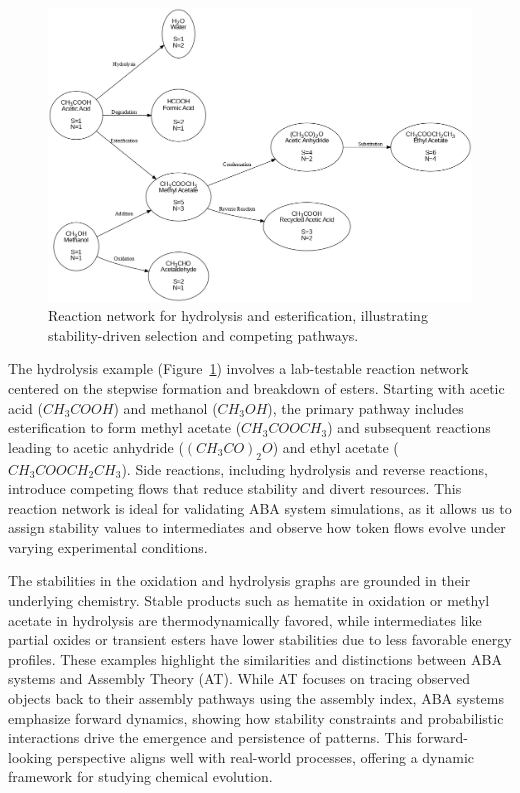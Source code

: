 \documentclass[entropy,article,submit,pdftex,oneauthor]{Definitions/mdpi}
\begin{document}
\begin{figure}[h]
    \centering
    \includegraphics[width=1\textwidth]{abc_hydro.png}
    \caption{Reaction network for hydrolysis and esterification, illustrating stability-driven selection and competing pathways.}
    \label{fig:abc_hydro}
\end{figure}

The hydrolysis example (Figure~\ref{fig:abc_hydro}) involves a lab-testable reaction network centered on the stepwise formation and breakdown of esters. Starting with acetic acid (\(CH_3COOH\)) and methanol (\(CH_3OH\)), the primary pathway includes esterification to form methyl acetate (\(CH_3COOCH_3\)) and subsequent reactions leading to acetic anhydride (\((CH_3CO)_2O\)) and ethyl acetate (\(CH_3COOCH_2CH_3\)). Side reactions, including hydrolysis and reverse reactions, introduce competing flows that reduce stability and divert resources. This reaction network is ideal for validating ABA system simulations, as it allows us to assign stability values to intermediates and observe how token flows evolve under varying experimental conditions.

The stabilities in the oxidation and hydrolysis graphs are grounded in their underlying chemistry. Stable products such as hematite in oxidation or methyl acetate in hydrolysis are thermodynamically favored, while intermediates like partial oxides or transient esters have lower stabilities due to less favorable energy profiles. These examples highlight the similarities and distinctions between ABA systems and Assembly Theory (AT). While AT focuses on tracing observed objects back to their assembly pathways using the assembly index, ABA systems emphasize forward dynamics, showing how stability constraints and probabilistic interactions drive the emergence and persistence of patterns. This forward-looking perspective aligns well with real-world processes, offering a dynamic framework for studying chemical evolution.
\end{document}

